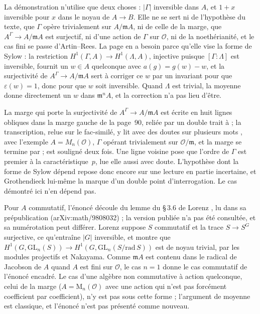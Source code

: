 \begin{remarque}
La démonstration n'utilise que deux choses : $|\Gamma|$ inversible dans $A$, et $1 + x$ inversible pour $x$ dans le noyau de $A \to B$. Elle ne se sert ni de l'hypothèse du texte, que $\Gamma$ opère trivialement sur $A/\mathfrak mA$, ni de celle de la marge, que $A^\Gamma \to A/\mathfrak mA$ est surjectif, ni d'une action de $\Gamma$ sur $\mathcal O$, ni de la noethérianité, et le cas fini se passe d'Artin--Rees. La page en a besoin parce qu'elle vise la forme de Sylow : la restriction $H^1(\Gamma, A) \to H^1(\Lambda, A)$, injective puisque $[\Gamma : \Lambda]$ est inversible, fournit un $w \in A$ quelconque avec $a(g) = g(w) - w$, et la surjectivité de $A^\Gamma \to A/\mathfrak mA$ sert à corriger ce $w$ par un invariant pour que $\varepsilon(w) = 1$, donc pour que $w$ soit inversible. Quand $\Lambda$ est trivial, la moyenne donne directement un $w$ dans $\mathfrak m^nA$, et la correction n'a pas lieu d'être.
\end{remarque}

\begin{remarque}
La marge qui porte la surjectivité de $A^\Gamma \to A/\mathfrak mA$ est écrite en huit lignes obliques dans la marge gauche de la page~90, reliée par un double trait à  ; la transcription, relue sur le fac-similé, y lit avec des doutes sur plusieurs mots , avec l'exemple $A = M_n(\mathcal O)$, $\Gamma$ opérant trivialement sur $\mathcal O/\mathfrak m$, et la marge se termine par  ;  est souligné deux fois. Une ligne voisine pose que l'ordre de $\Gamma$ est premier à la caractéristique~$p$, lue elle aussi avec doute. L'hypothèse dont la forme de Sylow dépend repose donc encore sur une lecture en partie incertaine, et Grothendieck lui-même la marque d'un double point d'interrogation. Le cas démontré ici n'en dépend pas.
\end{remarque}

\begin{remarque}
Pour $A$ commutatif, l'énoncé découle du lemme du §\,3.6 de Lorenz \cite{lorenz1999}, lu dans sa prépublication (arXiv:math/9808032) ; la version publiée n'a pas été consultée, et sa numérotation peut différer. Lorenz suppose $S$ commutatif et la trace $S \to S^G$ surjective, ce qu'entraîne $|G|$ inversible, et montre que $H^1(G, \mathrm{GL}_n(S)) \to H^1(G, \mathrm{GL}_n(S/\mathrm{rad}\, S))$ est de noyau trivial, par les modules projectifs et Nakayama. Comme $\mathfrak mA$ est contenu dans le radical de Jacobson de $A$ quand $A$ est fini sur $\mathcal O$, le cas $n = 1$ donne le cas commutatif de l'énoncé encadré. Le cas d'une algèbre non commutative à action quelconque, celui de la marge ($A = \mathrm M_n(\mathcal O)$ avec une action qui n'est pas forcément coefficient par coefficient), n'y est pas sous cette forme ; l'argument de moyenne est classique, et l'énoncé n'est pas présenté comme nouveau.
\end{remarque}

